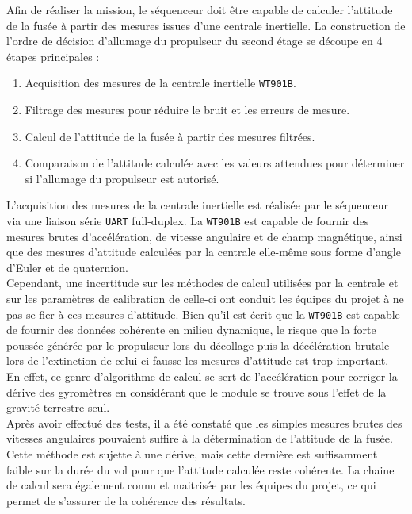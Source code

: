 Afin de réaliser la mission, le séquenceur doit être capable de calculer l'attitude de la fusée à partir des mesures issues d'une
centrale inertielle. La construction de l'ordre de décision d'allumage du propulseur du second étage se découpe en 4 étapes
principales :

\begin{enumerate}
	\item Acquisition des mesures de la centrale inertielle \texttt{WT901B}.
	\item Filtrage des mesures pour réduire le bruit et les erreurs de mesure.
	\item Calcul de l'attitude de la fusée à partir des mesures filtrées.
	\item Comparaison de l'attitude calculée avec les valeurs attendues pour déterminer si l'allumage du propulseur est autorisé.
\end{enumerate}


L'acquisition des mesures de la centrale inertielle est réalisée par le séquenceur via une liaison série \texttt{UART} full-duplex.
La \texttt{WT901B} est capable de fournir des mesures brutes d'accélération, de vitesse angulaire et de champ magnétique, ainsi que
des mesures d'attitude calculées par la centrale elle-même sous forme d'angle d'Euler et de quaternion.\\

Cependant, une incertitude sur les méthodes de calcul utilisées par la centrale et sur les paramètres de calibration de celle-ci
ont conduit les équipes du projet à ne pas se fier à ces mesures d'attitude. Bien qu'il est écrit que la \texttt{WT901B} est
capable de fournir des données cohérente en milieu dynamique, le risque que la forte poussée générée par le propulseur lors du
décollage puis la décélération brutale lors de l'extinction de celui-ci fausse les mesures d'attitude est trop important. En
effet, ce genre d'algorithme de calcul se sert de l'accélération pour corriger la dérive des gyromètres en considérant que le
module se trouve sous l'effet de la gravité terrestre seul.\\

Après avoir effectué des tests, il a été constaté que les simples mesures brutes des vitesses angulaires pouvaient suffire à
la détermination de l'attitude de la fusée. Cette méthode est sujette à une dérive, mais cette dernière est suffisamment faible
sur la durée du vol pour que l'attitude calculée reste cohérente. La chaine de calcul sera également connu et maitrisée par les
équipes du projet, ce qui permet de s'assurer de la cohérence des résultats.\\

